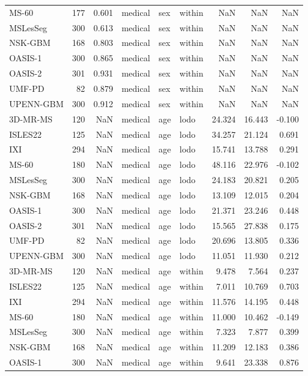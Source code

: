 \begin{tabular}{lrrlllrrr}
MS-60 & 177 & 0.601 & medical & sex & within & NaN & NaN & NaN \\
MSLesSeg & 300 & 0.613 & medical & sex & within & NaN & NaN & NaN \\
NSK-GBM & 168 & 0.803 & medical & sex & within & NaN & NaN & NaN \\
OASIS-1 & 300 & 0.865 & medical & sex & within & NaN & NaN & NaN \\
OASIS-2 & 301 & 0.931 & medical & sex & within & NaN & NaN & NaN \\
UMF-PD & 82 & 0.879 & medical & sex & within & NaN & NaN & NaN \\
UPENN-GBM & 300 & 0.912 & medical & sex & within & NaN & NaN & NaN \\
3D-MR-MS & 120 & NaN & medical & age & lodo & 24.324 & 16.443 & -0.100 \\
ISLES22 & 125 & NaN & medical & age & lodo & 34.257 & 21.124 & 0.691 \\
IXI & 294 & NaN & medical & age & lodo & 15.741 & 13.788 & 0.291 \\
MS-60 & 180 & NaN & medical & age & lodo & 48.116 & 22.976 & -0.102 \\
MSLesSeg & 300 & NaN & medical & age & lodo & 24.183 & 20.821 & 0.205 \\
NSK-GBM & 168 & NaN & medical & age & lodo & 13.109 & 12.015 & 0.204 \\
OASIS-1 & 300 & NaN & medical & age & lodo & 21.371 & 23.246 & 0.448 \\
OASIS-2 & 301 & NaN & medical & age & lodo & 15.565 & 27.838 & 0.175 \\
UMF-PD & 82 & NaN & medical & age & lodo & 20.696 & 13.805 & 0.336 \\
UPENN-GBM & 300 & NaN & medical & age & lodo & 11.051 & 11.930 & 0.212 \\
3D-MR-MS & 120 & NaN & medical & age & within & 9.478 & 7.564 & 0.237 \\
ISLES22 & 125 & NaN & medical & age & within & 7.011 & 10.769 & 0.703 \\
IXI & 294 & NaN & medical & age & within & 11.576 & 14.195 & 0.448 \\
MS-60 & 180 & NaN & medical & age & within & 11.000 & 10.462 & -0.149 \\
MSLesSeg & 300 & NaN & medical & age & within & 7.323 & 7.877 & 0.399 \\
NSK-GBM & 168 & NaN & medical & age & within & 11.209 & 12.183 & 0.386 \\
OASIS-1 & 300 & NaN & medical & age & within & 9.641 & 23.338 & 0.876 \\

\end{tabular}
